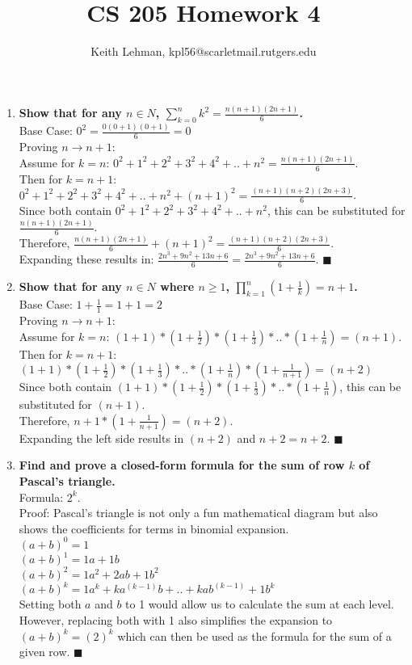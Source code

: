 \documentclass{article}
\title{CS 205 Homework 4}
\author{Keith Lehman, kpl56@scarletmail.rutgers.edu}
\begin{document}
\maketitle

\begin{enumerate}

\item \textbf{Show that for any $n \in N$, $\sum_{k=0}^{n} k^2 = \frac{n(n+1)(2n+1)}{6}$.} \\
Base Case: $0^2 = \frac{0(0+1)(0+1)}{6} = 0$ \\
Proving $n \to n+1$: \\
Assume for $k=n$: $0^2 + 1^2 + 2^2 + 3^2 + 4^2 + .. + n^2 = \frac{n(n+1)(2n+1)}{6}$. \\
Then for $k=n+1$: $0^2 + 1^2 + 2^2 + 3^2 + 4^2 + .. + n^2 + (n+1)^2 = \frac{(n+1)(n+2)(2n+3)}{6}$. \\
Since both contain $0^2 + 1^2 + 2^2 + 3^2 + 4^2 + .. + n^2$, this can be substituted for $\frac{n(n+1)(2n+1)}{6}$. \\
Therefore, $\frac{n(n+1)(2n+1)}{6} + (n+1)^2 = \frac{(n+1)(n+2)(2n+3)}{6}$. \\
Expanding these results in: $\frac{2n^3 + 9n^2 + 13n + 6}{6} = \frac{2n^3 + 9n^2 + 13n + 6}{6}$. $\blacksquare$

\item \textbf{Show that for any $n \in N$ where $n \geq 1$, $\prod_{k=1}^{n} (1 + \frac{1}{k}) = n + 1$.} \\
Base Case: $1+\frac{1}{1} = 1 + 1 = 2$ \\ 
Proving $n \to n+1$: \\
Assume for $k=n$: $(1+1) * (1+\frac{1}{2}) * (1+\frac{1}{3}) * .. * (1+\frac{1}{n}) = (n+1)$. \\
Then for $k=n+1$: $(1+1) * (1+\frac{1}{2}) * (1+\frac{1}{3}) * .. * (1+\frac{1}{n}) * (1+\frac{1}{n+1})= (n+2)$ \\
Since both contain $(1+1) * (1+\frac{1}{2}) * (1+\frac{1}{3}) * .. * (1+\frac{1}{n})$, this can be substituted for $(n+1)$. \\
Therefore, $n+1 * (1+\frac{1}{n+1}) = (n+2)$. \\
Expanding the left side results in $(n+2)$ and $n+2 = n+2$. $\blacksquare$

\item \textbf{Find and prove a closed-form formula for the sum of row $k$ of Pascal's triangle.} \\
Formula: $2^k$. \\
Proof: Pascal's triangle is not only a fun mathematical diagram but also shows the coefficients for terms in binomial expansion. \\
$(a+b)^0 = 1$ \\
$(a+b)^1 = 1a + 1b$ \\
$(a+b)^2 = 1a^2 + 2ab + 1b^2$ \\
$(a+b)^k = 1a^k + ka^{(k-1)} b + .. + kab^{(k-1)} + 1b^k$ \\
Setting both $a$ and $b$ to 1 would allow us to calculate the sum at each level. However, replacing both with 1 also simplifies the expansion to $(a+b)^k = (2)^k$ which can then be used as the formula for the sum of a given row. $\blacksquare$ \\


\end{enumerate}
\end{document}
